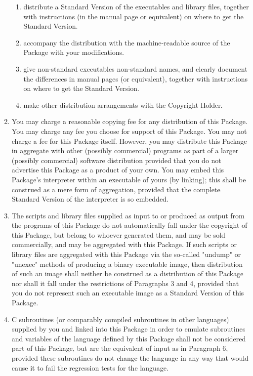 \begin{enumerate}
\begin{enumerate}
    \item distribute a Standard Version of the executables and library files,
    together with instructions (in the manual page or equivalent) on where
    to get the Standard Version.

    \item accompany the distribution with the machine-readable source of
    the Package with your modifications.

    \item give non-standard executables non-standard names, and clearly
    document the differences in manual pages (or equivalent), together
    with instructions on where to get the Standard Version.

    \item make other distribution arrangements with the Copyright Holder.

\end{enumerate}

\item You may charge a reasonable copying fee for any distribution of this
Package.  You may charge any fee you choose for support of this
Package.  You may not charge a fee for this Package itself.  However,
you may distribute this Package in aggregate with other (possibly
commercial) programs as part of a larger (possibly commercial) software
distribution provided that you do not advertise this Package as a
product of your own.  You may embed this Package's interpreter within
an executable of yours (by linking); this shall be construed as a mere
form of aggregation, provided that the complete Standard Version of the
interpreter is so embedded.

\item The scripts and library files supplied as input to or produced as
output from the programs of this Package do not automatically fall
under the copyright of this Package, but belong to whoever generated
them, and may be sold commercially, and may be aggregated with this
Package.  If such scripts or library files are aggregated with this
Package via the so-called "undump" or "unexec" methods of producing a
binary executable image, then distribution of such an image shall
neither be construed as a distribution of this Package nor shall it
fall under the restrictions of Paragraphs 3 and 4, provided that you do
not represent such an executable image as a Standard Version of this
Package.

\item C subroutines (or comparably compiled subroutines in other
languages) supplied by you and linked into this Package in order to
emulate subroutines and variables of the language defined by this
Package shall not be considered part of this Package, but are the
equivalent of input as in Paragraph 6, provided these subroutines do
not change the language in any way that would cause it to fail the
regression tests for the language.


\end{enumerate}

